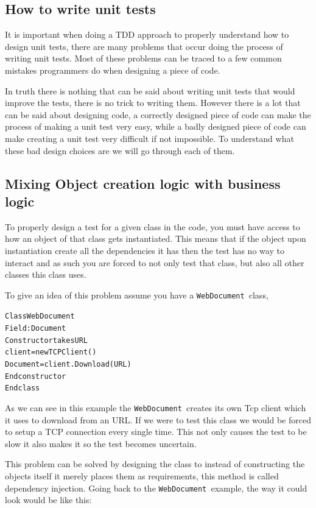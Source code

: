 \subsection{How to write unit tests}

It is important when doing a TDD approach to properly understand how
to design unit tests, there are many problems that occur doing the
process of writing unit tests. Most of these problems can be traced
to a few common mistakes programmers do when designing a piece of
code. 

In truth there is nothing that can be said about writing unit tests
that would improve the tests, there is no trick to writing them. However
there is a lot that can be said about designing code, a correctly
designed piece of code can make the process of making a unit test
very easy, while a badly designed piece of code can make creating
a unit test very difficult if not impossible. To understand what these
bad design choices are we will go through each of them.


\subsection{Mixing Object creation logic with business logic}

To properly design a test for a given class in the code, you must
have access to how an object of that class gets instantiated. This
means that if the object upon instantiation create all the dependencies
it has then the test has no way to interact and as such you are forced
to not only test that class, but also all other classes this class
uses.

To give an idea of this problem assume you have a \texttt{WebDocument
}class, 

\begin{alltt}
Class WebDocument 	
    Field: Document 	
    Constructor takes URL 		
        client = new TCPClient() 		
        Document = client.Download(URL)
    Endconstructor 
Endclass
\end{alltt}

As we can see in this example the \texttt{WebDocument }creates its
own Tcp client which it uses to download from an URL. If we were to
test this class we would be forced to setup a TCP connection every
single time. This not only causes the test to be slow it also makes
it so the test becomes uncertain.

This problem can be solved by designing the class to instead of constructing
the objects itself it merely places them as requirements, this method
is called dependency injection. Going back to the \texttt{WebDocument
}example, the way it could look would be like this:


